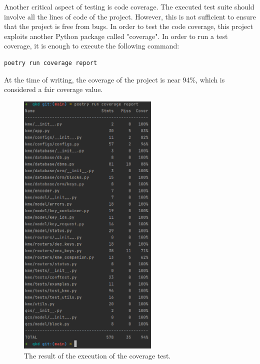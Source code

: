 Another critical aspect of testing is code coverage. The executed test suite should involve all the lines of code of the project. However, this is not sufficient to ensure that the project is free from bugs. In order to test the code coverage, this project exploits another Python package called "coverage". In order to run a test coverage, it is enough to execute the following command:

\begin{verbatim}
poetry run coverage report
\end{verbatim}

At the time of writing, the coverage of the project is near 94\%, which is considered a fair coverage value.

\begin{figure}[H]
    \centering
    \includegraphics[width=0.6\textwidth]{Images/coverage.png}
    \caption{The result of the execution of the coverage test.}
    \label{fig:coverage}
\end{figure}

